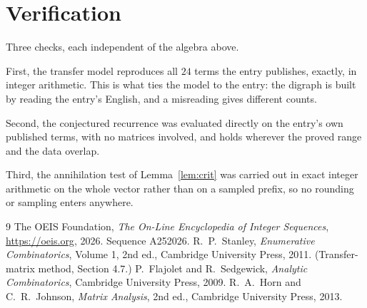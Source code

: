 \documentclass[11pt,a4paper]{article}
\theoremstyle{plain}
\theoremstyle{definition}
\begin{document}
\section{Verification}

Three checks, each independent of the algebra above.

First, the transfer model reproduces all $24$ terms the entry publishes, exactly, in
integer arithmetic. This is what ties the model to the entry: the digraph is built by reading
the entry's English, and a misreading gives different counts.

Second, the conjectured recurrence was evaluated directly on the entry's own published terms,
with no matrices involved, and holds wherever the proved range and the data overlap.

Third, the annihilation test of Lemma~\ref{lem:crit} was carried out in exact integer
arithmetic on the whole vector rather than on a sampled prefix, so no rounding or sampling
enters anywhere.

\begin{thebibliography}{9}
 The OEIS Foundation, \emph{The On-Line Encyclopedia of Integer
Sequences}, \url{https://oeis.org}, 2026. Sequence A252026.
 R.~P.~Stanley, \emph{Enumerative Combinatorics}, Volume 1, 2nd ed.,
Cambridge University Press, 2011. (Transfer-matrix method, Section 4.7.)
 P.~Flajolet and R.~Sedgewick, \emph{Analytic Combinatorics}, Cambridge
University Press, 2009.
 R.~A.~Horn and C.~R.~Johnson, \emph{Matrix Analysis}, 2nd ed., Cambridge
University Press, 2013.
\end{thebibliography}
\end{document}
